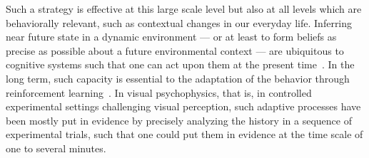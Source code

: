 \documentclass[profile,final,english,draft]{article}%
\newcommand{\citep}[1]{\parencite{#1}}
\begin{document}
Such a strategy is effective at this large scale level
but also at all levels which are behaviorally relevant,
such as contextual changes in our everyday life.
Inferring near future state in a dynamic environment ---
or at least to form beliefs as precise as possible
about a future environmental context ---
are ubiquitous to cognitive systems
such that one can act upon them at the present time~\citep{ref}.
In the long term, such capacity is essential to the adaptation
of the behavior through reinforcement learning~\citep{ref}.
In visual psychophysics, that is,
in controlled experimental settings challenging visual perception,
such adaptive processes have been mostly put in evidence
by precisely analyzing the history in a sequence of experimental trials,
such that one could put them in evidence
at the time scale of one to several minutes.
\end{document}
